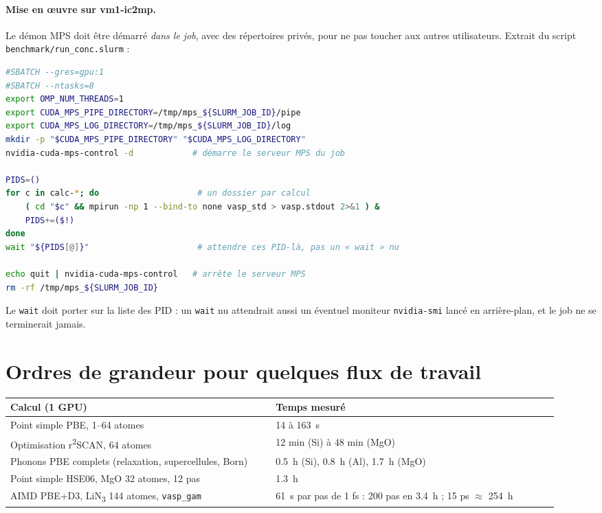 \documentclass[11pt,a4paper]{article}
\newcommand{\rscan}{r\textsuperscript{2}SCAN}
\begin{document}
\paragraph{Mise en œuvre sur vm1-ic2mp.} Le démon MPS doit être démarré \emph{dans le job},
avec des répertoires privés, pour ne pas toucher aux autres utilisateurs. Extrait du script
\texttt{benchmark/run\_conc.slurm} :

\begin{lstlisting}[language=bash]
#SBATCH --gres=gpu:1
#SBATCH --ntasks=8
export OMP_NUM_THREADS=1
export CUDA_MPS_PIPE_DIRECTORY=/tmp/mps_${SLURM_JOB_ID}/pipe
export CUDA_MPS_LOG_DIRECTORY=/tmp/mps_${SLURM_JOB_ID}/log
mkdir -p "$CUDA_MPS_PIPE_DIRECTORY" "$CUDA_MPS_LOG_DIRECTORY"
nvidia-cuda-mps-control -d            # démarre le serveur MPS du job

PIDS=()
for c in calc-*; do                    # un dossier par calcul
    ( cd "$c" && mpirun -np 1 --bind-to none vasp_std > vasp.stdout 2>&1 ) &
    PIDS+=($!)
done
wait "${PIDS[@]}"                      # attendre ces PID-là, pas un « wait » nu

echo quit | nvidia-cuda-mps-control   # arrête le serveur MPS
rm -rf /tmp/mps_${SLURM_JOB_ID}
\end{lstlisting}

Le \texttt{wait} doit porter sur la liste des PID : un \texttt{wait} nu attendrait aussi un
éventuel moniteur \texttt{nvidia-smi} lancé en arrière-plan, et le job ne se terminerait jamais.

\section{Ordres de grandeur pour quelques flux de travail}
\label{sec:workflows}

\begin{center}
\small
\begin{tabular}{@{}p{0.45\linewidth}p{0.48\linewidth}@{}}
\toprule
Calcul (1 GPU) & Temps mesuré \\
\midrule
Point simple PBE, 1--64 atomes & 14 à \SI{163}{s} \\
Optimisation \rscan{}, 64 atomes & 12 min (Si) à 48 min (MgO) \\
Phonons PBE complets (relaxation, supercellules, Born) & \SI{0,5}{h} (Si), \SI{0,8}{h} (Al), \SI{1,7}{h} (MgO) \\
Point simple HSE06, MgO 32 atomes, 12 pas & \SI{1,3}{h} \\
AIMD PBE+D3, LiN\textsubscript{3} 144 atomes, \texttt{vasp\_gam} & \SI{61}{s} par pas de 1 fs : 200 pas en \SI{3,4}{h} ; 15 ps $\approx$ \SI{254}{h} \\
\bottomrule
\end{tabular}
\end{center}
\end{document}
